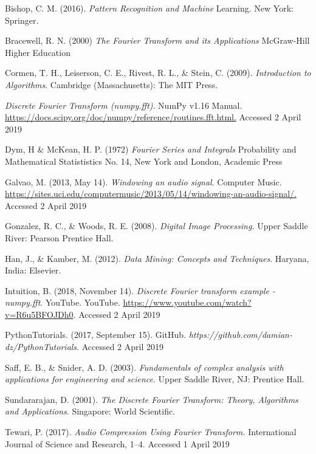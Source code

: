 \documentclass{amsproc}
\begin{document}
\newpage

\begin{thebibliography}{200}

 Bishop, C. M. (2016). \emph{Pattern Recognition and Machine} Learning. New York: Springer.

 Bracewell, R. N. (2000) \emph{The Fourier Transform and its Applications} McGraw-Hill Higher Education

 Cormen, T. H., Leiserson, C. E., Rivest, R. L., \& Stein, C. (2009). \emph{Introduction to Algorithms}. Cambridge (Massachusetts): The MIT Press.

 \emph{Discrete Fourier Transform (numpy.fft)}. NumPy v1.16 Manual. \url{https://docs.scipy.org/doc/numpy/reference/routines.fft.html.} Accessed 2 April 2019

 Dym, H \& McKean, H. P. (1972) \emph{Fourier Series and Integrals} Probability and Mathematical Statististics No. 14, New York and London, Academic Press

 Galvao, M. (2013, May 14). \emph{Windowing an audio signal}. Computer Music. \url{https://sites.uci.edu/computermusic/2013/05/14/windowing-an-audio-signal/.} Accessed 2 April 2019

 Gonzalez, R. C., \& Woods, R. E. (2008). \emph{Digital Image Processing.} Upper Saddle River: Pearson Prentice Hall.

 Han, J., \& Kamber, M. (2012). \emph{Data Mining: Concepts and Techniques}. Haryana, India: Elsevier.

 Intuition, B. (2018, November 14). \emph{Discrete Fourier transform example - numpy.fft}. YouTube. YouTube. \url{https://www.youtube.com/watch?v=R6u5BFOJDh0}. Accessed 2 April 2019

 PythonTutorials. (2017, September 15). GitHub. \emph{https://github.com/damian-dz/PythonTutorials}. Accessed 2 April 2019

 Saff, E. B., \& Snider, A. D. (2003). \emph{Fundamentals of complex analysis with applications for engineering and science}. Upper Saddle River, NJ: Prentice Hall.

 Sundararajan, D. (2001). \emph{The Discrete Fourier Transform: Theory, Algorithms and Applications}. Singapore: World Scientific.

 Tewari, P. (2017). \emph{Audio Compression Using Fourier Transform.} International Journal of Science and Research, 1–4. Accessed 1 April 2019

\end{thebibliography}
\end{document}
